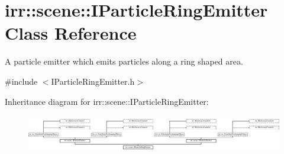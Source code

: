 \hypertarget{classirr_1_1scene_1_1IParticleRingEmitter}{}\section{irr\+:\+:scene\+:\+:I\+Particle\+Ring\+Emitter Class Reference}
\label{classirr_1_1scene_1_1IParticleRingEmitter}


A particle emitter which emits particles along a ring shaped area.  




{\ttfamily \#include $<$I\+Particle\+Ring\+Emitter.\+h$>$}

Inheritance diagram for irr\+:\+:scene\+:\+:I\+Particle\+Ring\+Emitter\+:\begin{figure}[H]
\begin{center}
\leavevmode
\includegraphics[height=1.682692cm]{classirr_1_1scene_1_1IParticleRingEmitter}
\end{center}
\end{figure}
